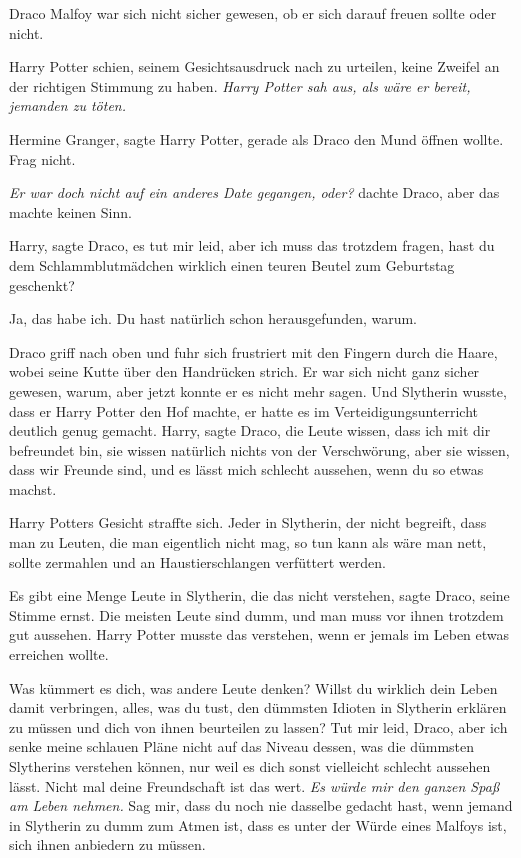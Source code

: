 Draco Malfoy war sich nicht sicher gewesen, ob er sich darauf freuen sollte oder
nicht.

Harry Potter schien, seinem Gesichtsausdruck nach zu urteilen, keine Zweifel an
der richtigen Stimmung zu haben. \emph{Harry Potter sah aus, als wäre er bereit,
jemanden zu töten.}

\glqq Hermine Granger\grqq{}, sagte Harry Potter, gerade als Draco den Mund
öffnen wollte. \glqq Frag nicht.\grqq{}

\emph{Er war doch nicht auf ein anderes Date gegangen, oder?} dachte Draco, aber
das machte keinen Sinn.

\glqq Harry\grqq{}, sagte Draco, \glqq es tut mir leid, aber ich muss das
trotzdem fragen, hast du dem Schlammblutmädchen wirklich einen teuren Beutel zum
Geburtstag geschenkt?\grqq{}

\glqq Ja, das habe ich. Du hast natürlich schon herausgefunden, warum.\grqq{}

Draco griff nach oben und fuhr sich frustriert mit den Fingern durch die Haare,
wobei seine Kutte über den Handrücken strich. Er war sich nicht ganz sicher
gewesen, warum, aber jetzt konnte er es nicht mehr sagen. Und Slytherin wusste,
dass er Harry Potter den Hof machte, er hatte es im Verteidigungsunterricht
deutlich genug gemacht. \glqq Harry\grqq{}, sagte Draco, \glqq die Leute wissen,
dass ich mit dir befreundet bin, sie wissen natürlich nichts von der
Verschwörung, aber sie wissen, dass wir Freunde sind, und es lässt mich schlecht
aussehen, wenn du so etwas machst.\grqq{}

Harry Potters Gesicht straffte sich. \glqq Jeder in Slytherin, der nicht
begreift, dass man zu Leuten, die man eigentlich nicht mag, so tun kann als wäre
man nett, sollte zermahlen und an Haustierschlangen verfüttert werden.\grqq{}

\glqq Es gibt eine Menge Leute in Slytherin, die das nicht verstehen\grqq{},
sagte Draco, seine Stimme ernst. \glqq Die meisten Leute sind dumm, und man muss
vor ihnen trotzdem gut aussehen.\grqq{} Harry Potter musste das verstehen, wenn
er jemals im Leben etwas erreichen wollte.

\glqq Was kümmert es dich, was andere Leute denken? Willst du wirklich dein
Leben damit verbringen, alles, was du tust, den dümmsten Idioten in Slytherin
erklären zu müssen und dich von ihnen beurteilen zu lassen? Tut mir leid, Draco,
aber ich senke meine schlauen Pläne nicht auf das Niveau dessen, was die
dümmsten Slytherins verstehen können, nur weil es dich sonst vielleicht schlecht
aussehen lässt. Nicht mal deine Freundschaft ist das wert. \emph{Es würde mir
den ganzen Spaß am Leben nehmen.} Sag mir, dass du noch nie dasselbe gedacht
hast, wenn jemand in Slytherin zu dumm zum Atmen ist, dass es unter der Würde
eines Malfoys ist, sich ihnen anbiedern zu müssen.\grqq{}

